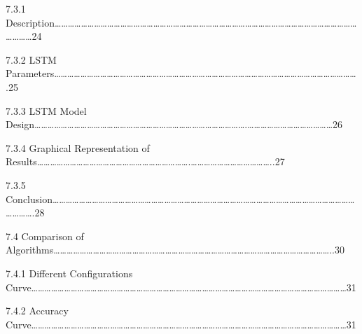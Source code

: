 \documentclass[a4paper,12pt]{article}
\begin{document}
7.3.1
Description\ldots\ldots\ldots\ldots\ldots\ldots\ldots\ldots\ldots\ldots\ldots\ldots\ldots\ldots\ldots\ldots\ldots\ldots\ldots\ldots\ldots\ldots\ldots\ldots\ldots\ldots\ldots\ldots\ldots\ldots\ldots\ldots\ldots\ldots\ldots\ldots\ldots\ldots\ldots\ldots\ldots\ldots\ldots\ldots\ldots\ldots\ldots\ldots\ldots\ldots24

7.3.2 LSTM
Parameters\ldots\ldots\ldots\ldots\ldots\ldots\ldots\ldots\ldots\ldots\ldots\ldots\ldots\ldots\ldots\ldots\ldots\ldots\ldots\ldots\ldots\ldots\ldots\ldots\ldots\ldots\ldots\ldots\ldots\ldots\ldots\ldots\ldots\ldots\ldots\ldots\ldots\ldots\ldots\ldots\ldots\ldots\ldots\ldots\ldots\ldots.25

7.3.3 LSTM Model
Design\ldots\ldots\ldots\ldots\ldots\ldots\ldots\ldots\ldots\ldots\ldots\ldots\ldots\ldots\ldots\ldots\ldots\ldots\ldots\ldots\ldots\ldots\ldots\ldots\ldots\ldots\ldots\ldots\ldots\ldots\ldots\ldots.\ldots\ldots\ldots\ldots\ldots\ldots\ldots\ldots\ldots\ldots\ldots\ldots\ldots26

7.3.4 Graphical Representation of
Results\ldots\ldots\ldots\ldots\ldots\ldots\ldots\ldots\ldots\ldots\ldots\ldots\ldots\ldots\ldots\ldots\ldots\ldots\ldots\ldots\ldots\ldots\ldots.\ldots\ldots\ldots\ldots\ldots\ldots\ldots\ldots\ldots\ldots\ldots\ldots..27

7.3.5
Conclusion\ldots\ldots\ldots\ldots\ldots\ldots\ldots\ldots\ldots\ldots\ldots\ldots\ldots\ldots\ldots\ldots\ldots\ldots\ldots\ldots\ldots\ldots\ldots\ldots\ldots\ldots\ldots\ldots\ldots\ldots\ldots\ldots\ldots\ldots\ldots\ldots\ldots\ldots\ldots\ldots\ldots\ldots\ldots\ldots\ldots\ldots\ldots\ldots\ldots\ldots.28

7.4 Comparison of
Algorithms\ldots\ldots\ldots\ldots\ldots\ldots\ldots\ldots\ldots\ldots\ldots\ldots\ldots\ldots\ldots\ldots\ldots\ldots\ldots\ldots\ldots\ldots\ldots\ldots\ldots\ldots\ldots\ldots\ldots\ldots\ldots\ldots\ldots\ldots\ldots\ldots\ldots\ldots\ldots\ldots\ldots\ldots..30

7.4.1 Different Configurations
Curve\ldots\ldots\ldots\ldots\ldots\ldots\ldots\ldots\ldots\ldots\ldots\ldots\ldots\ldots\ldots\ldots\ldots\ldots\ldots\ldots\ldots\ldots\ldots\ldots\ldots\ldots\ldots\ldots\ldots\ldots\ldots\ldots\ldots\ldots\ldots\ldots\ldots\ldots\ldots\ldots\ldots\ldots\ldots\ldots\ldots\ldots\ldots\ldots31

7.4.2 Accuracy
Curve\ldots\ldots\ldots\ldots\ldots\ldots\ldots\ldots\ldots\ldots\ldots\ldots\ldots\ldots\ldots\ldots\ldots\ldots\ldots\ldots\ldots\ldots\ldots\ldots\ldots\ldots\ldots\ldots\ldots\ldots\ldots\ldots\ldots\ldots\ldots\ldots\ldots\ldots\ldots\ldots\ldots\ldots\ldots\ldots\ldots\ldots\ldots\ldots31
\end{document}
